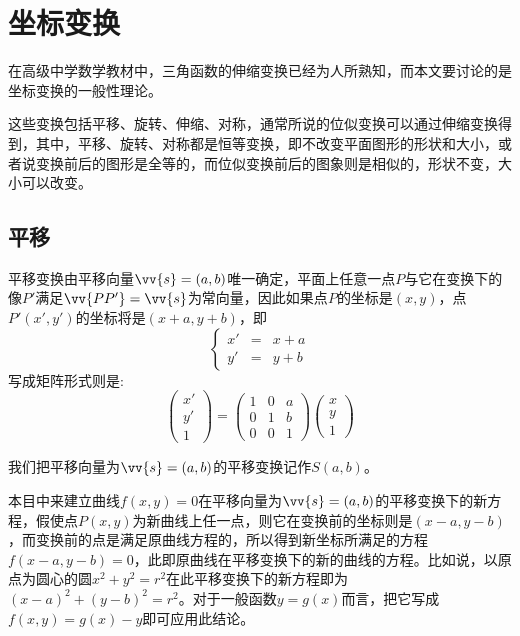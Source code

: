 
\section{坐标变换}
\label{sec:codinatie-axias-rotation}

在高级中学数学教材中，三角函数的伸缩变换已经为人所熟知，而本文要讨论的是坐标变换的一般性理论。

这些变换包括平移、旋转、伸缩、对称，通常所说的位似变换可以通过伸缩变换得到，其中，平移、旋转、对称都是恒等变换，即不改变平面图形的形状和大小，或者说变换前后的图形是全等的，而位似变换前后的图象则是相似的，形状不变，大小可以改变。

\subsection{平移}

平移变换由平移向量$\vv{s}=(a,b)$唯一确定，平面上任意一点$P$与它在变换下的像$P'$满足$\vv{PP'}=\vv{s}$为常向量，因此如果点$P$的坐标是$(x,y)$，点$P'(x',y')$的坐标将是$(x+a, y+b)$，即
\begin{equation}
  \label{eq:shift-translation-coordinate-formula}
  \left\{
      \begin{array}{ccc}
        x' & = & x + a \\
        y' & = & y + b
      \end{array}
  \right.
\end{equation}
写成矩阵形式则是:
\begin{equation}
  \label{eq:shift-translation-coordinate-formula-matrix}
  \left(
    \begin{array}{c}
      x' \\
      y' \\
      1
    \end{array}
  \right)
  =
  \left(
    \begin{array}{ccc}
      1 & 0 & a \\
      0 & 1 & b \\
      0 & 0 & 1
    \end{array}
  \right)
  \left(
    \begin{array}{c}
      x \\
      y \\
      1
    \end{array}
  \right)
\end{equation}

我们把平移向量为$\vv{s}=(a,b)$的平移变换记作$S(a,b)$。

\begin{example}
  本目中来建立曲线$f(x,y)=0$在平移向量为$\vv{s}=(a,b)$的平移变换下的新方程，假使点$P(x,y)$为新曲线上任一点，则它在变换前的坐标则是$(x-a,y-b)$，而变换前的点是满足原曲线方程的，所以得到新坐标所满足的方程$f(x-a,y-b)=0$，此即原曲线在平移变换下的新的曲线的方程。比如说，以原点为圆心的圆$x^2+y^2=r^2$在此平移变换下的新方程即为$(x-a)^2+(y-b)^2=r^2$。对于一般函数$y=g(x)$而言，把它写成$f(x,y)=g(x)-y$即可应用此结论。
\end{example}

